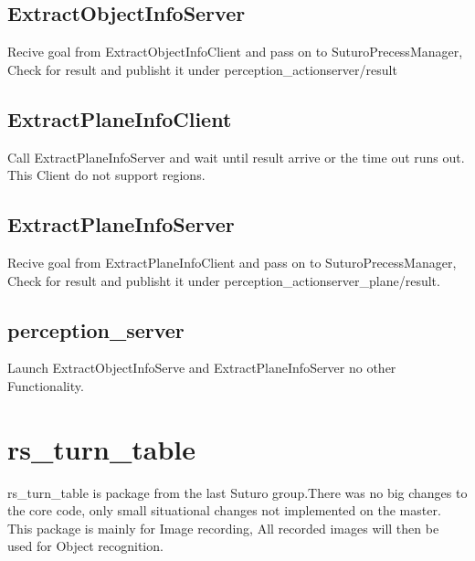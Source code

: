 \documentclass[main.tex]{subfiles}
\begin{document}
			\subsection{ExtractObjectInfoServer}
Recive goal from ExtractObjectInfoClient and pass on to SuturoPrecessManager, Check for result and publisht it under perception\_actionserver/result 

			\subsection{ExtractPlaneInfoClient}
Call ExtractPlaneInfoServer and wait until result arrive or the time out runs out. This Client do not support regions. 

			\subsection{ExtractPlaneInfoServer}
Recive goal from ExtractPlaneInfoClient and pass on to SuturoPrecessManager, Check for result and publisht it under perception\_actionserver\_plane/result.

			\subsection{perception\_server}
Launch ExtractObjectInfoServe and ExtractPlaneInfoServer no other Functionality.



		\section{rs\_turn\_table}
rs\_turn\_table is package from the last Suturo group.There was no big changes to the core code, only small situational changes not implemented on the master. 
This package is mainly for Image recording, All recorded images will then be used for Object recognition.  
\end{document}
